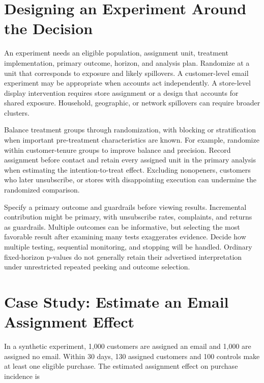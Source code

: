 \hypertarget{M06-designing-an-experiment-around-the-decision}{%
\section{Designing an Experiment Around the
Decision}\label{M06-designing-an-experiment-around-the-decision}}

\noindent An experiment needs an eligible population, assignment unit, treatment
implementation, primary outcome, horizon, and analysis plan. Randomize
at a unit that corresponds to exposure and likely spillovers. A
customer-level email experiment may be appropriate when accounts act
independently. A store-level display intervention requires store
assignment or a design that accounts for shared exposure. Household,
geographic, or network spillovers can require broader clusters.

Balance treatment groups through randomization, with blocking or
stratification when important pre-treatment characteristics are known.
For example, randomize within customer-tenure groups to improve balance
and precision. Record assignment before contact and retain every
assigned unit in the primary analysis when estimating the
intention-to-treat effect. Excluding nonopeners, customers who later
unsubscribe, or stores with disappointing execution can undermine the
randomized comparison.

Specify a primary outcome and guardrails before viewing results.
Incremental contribution might be primary, with unsubscribe rates,
complaints, and returns as guardrails. Multiple outcomes can be
informative, but selecting the most favorable result after examining
many tests exaggerates evidence. Decide how multiple testing, sequential
monitoring, and stopping will be handled. Ordinary fixed-horizon
p-values do not generally retain their advertised interpretation under
unrestricted repeated peeking and outcome selection.

\hypertarget{M06-case-study-estimate-an-email-assignment-effect}{%
\section{Case Study: Estimate an Email Assignment
Effect}\label{M06-case-study-estimate-an-email-assignment-effect}}

\noindent In a synthetic experiment, 1,000 customers are assigned an email and
1,000 are assigned no email. Within 30 days, 130 assigned customers and
100 controls make at least one eligible purchase. The estimated
assignment effect on purchase incidence is


